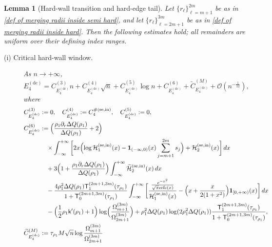 \documentclass[a4paper]{article}
\newtheorem{lemma}[theorem]{Lemma}
\newcommand{\erfc}{{\rm erfc}}
\numberwithin{equation}{section}
\begin{document}
\begin{lemma}[Hard-wall transition and hard-edge tail]
\label{lemma:semi hard edge case asymptotic expansion disck complement}
Let $\{r_{\ell}\}_{\ell=m+1}^{2m}$ be as in
\eqref{def of merging radii inside semi hard}, and let
$\{r_{\ell}\}_{\ell=2m+1}^{3m}$ be as in
\eqref{def of merging radii inside hard}.  Then the following estimates hold;
all remainders are uniform over their defining index ranges.
\begin{description}
    \item[\textup{(i) Critical hard-wall window.}] As $n\to+\infty$,
\begin{equation}
 E_4^{(\mathrm{dc})}
 =
 C_{E_4^{(\mathrm{dc})}}^{(3)}n +C_{E_4^{(\mathrm{dc})}}^{(4)}\sqrt{n}+C_{E_4^{(\mathrm{dc})}}^{(5)}\log n+C_{E_4^{(\mathrm{dc})}}^{(6)}+\widetilde{C}_{E_4^{(\mathrm{dc})}}^{(M)}+\mathcal{O}(n^{-\frac{1}{12}}),
\end{equation}    
where 
\begin{align*}
C_{E_4^{(\mathrm{dc})}}^{(3)}&:=0,
\quad
C_{E_4^{(\mathrm{dc})}}^{(4)}:=C_4^{\#(\mathrm{se,in})},
\quad
C_{E_4^{(\mathrm{dc})}}^{(5)}:=0, 
\\
C_{E_4^{(\mathrm{dc})}}^{(6)}&:=
\Bigl(\frac{\rho_1\partial_r\Delta Q(\rho_1)}{\Delta Q(\rho_1)}+2\Bigr)
\\
&\quad\times\int_{-\infty}^{+\infty}\bigg[
2x\Bigl(\log \mathcal{H}_1^{(\mathrm{se},\mathrm{in})}(x)-\mathbf{1}_{(-\infty,0)}(x)\sum_{j=m+1}^{2m}s_j\Bigr)
+
\mathcal{H}_2^{(\mathrm{se},\mathrm{in})}(x)
\bigg]
\,dx
\\
&\quad 
+
3\Bigl(1+\frac{\rho_1\partial_r\Delta Q(\rho_1)}{\Delta Q(\rho_1)}\Bigr)
\int_{-\infty}^{+\infty}
\widetilde{\mathcal{H}}_2^{(\mathrm{se},\mathrm{in})}(x)\,dx
\\
&\quad 
-\frac{4\rho_1^2\Delta Q(\rho_1)\mathsf{T}_{1}^{(2m+1,3m)}(\tau_{\rho_1})}{1+\mathsf{T}_{0}^{(2m+1,3m)}(\tau_{\rho_1})}
\int_{-\infty}^{+\infty}
\bigg[
\frac{\frac{e^{-x^2}}{\sqrt{\pi}\erfc(x)}}{\mathcal{H}_1^{(\mathrm{se},\mathrm{in})}(x)}
-
\Bigl( 
x+\frac{x}{2(1+x^2)}
\Bigr)
\mathbf{1}_{[0,+\infty)}(x)
\bigg]
\,dx
\\
&\quad 
-\Bigl(\frac{1}{2}\rho_1\mathsf{k}'(\rho_1)+1\Bigr)\log\Bigl(\frac{\Omega_{m+1}^{(3m)}}{\Omega_{2m+1}^{(3m)}}\Bigr)
+\rho_1^2\Delta Q(\rho_1)\log (2\rho_1^2\Delta Q(\rho_1))
\frac{\mathsf{T}_{1}^{(2m+1,3m)}(\tau_{\rho_1})}{1+\mathsf{T}_{0}^{(2m+1,3m)}(\tau_{\rho_1})} 
,\\
\widetilde{C}_{E_4^{(\mathrm{dc})}}^{(M)}
&:=
\tau_{\rho_1}M\sqrt{n}
\log\frac{\Omega_{m+1}^{(3m)}}{\Omega_{2m+1}^{(3m)}}

\end{align*}
\end{description}
\end{lemma}
\end{document}
